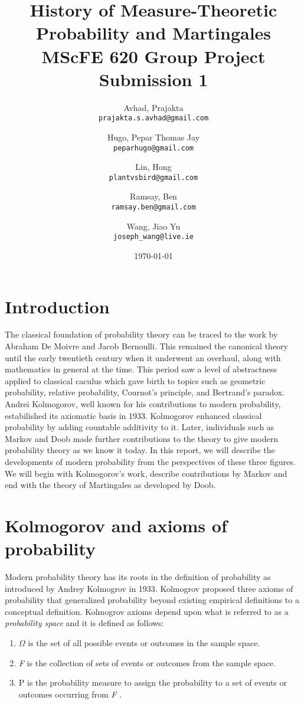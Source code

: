 \documentclass{article}
\title{History of Measure-Theoretic Probability and Martingales \\ MScFE 620 Group Project Submission 1}
\date{\today}
\author{
  Avhad, Prajakta\\
  \texttt{prajakta.s.avhad@gmail.com}
  \and
  Hugo, Pepar Thomas Jay\\
  \texttt{peparhugo@gmail.com}
  \and
  Lin, Hong\\
  \texttt{plantvsbird@gmail.com}
  \and
  Ramsay, Ben\\
  \texttt{ramsay.ben@gmail.com}
  \and
  Wang, Jiao Yu\\
  \texttt{joseph\_wang@live.ie}
}
\begin{document}
\maketitle  


\section{Introduction}
The classical foundation of probability theory can be traced to the work by Abraham De Moivre and Jacob Bernoulli. This remained the canonical theory until the early twentieth century when it underwent an overhaul, along with mathematics in general at the time. This period saw a level of abstractness applied to classical caculus which gave birth to topics such as geometric probability, relative probability, Cournot’s principle, and Bertrand’s paradox. Andrei Kolmogorov, well known for his contributions to modern probability, estabilished its axiomatic basis in 1933. Kolmogorov enhanced classical probability by adding countable additivity to it. Later, individuals such as Markov and Doob made further contributions to the theory to give modern probability theory as we know it today. In this report, we will describe the developments of modern probability from the perspectives of these three figures. We will begin with Kolmogorov's work, describe contributions by Markov and end with the theory of Martingales as developed by Doob. 

\section{Kolmogorov and axioms of probability}
Modern probability theory has its roots in the definition of probability as introduced by Andrey Kolmogrov in 1933. Kolmogrov proposed three axioms of probability that generalized probability beyond existing empirical definitions to a conceptual definition. Kolmogrov axioms depend upon what is referred to as a \textit{probability space} and it is defined as follows:

\begin{enumerate}
  \item $\Omega$ is the set of all possible events or outcomes in the sample space.
  \item \textit{F} is the collection of sets of events or outcomes from the sample space.
  \item P is the probability measure to assign the probability to a set of events or outcomes occurring from \textit{F} \parencite{Meyers2020}.
\end{enumerate}
\end{document}
